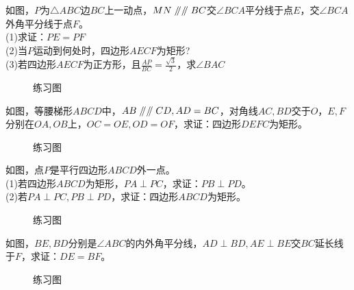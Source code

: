 \begin{problem}
如图，$P$为$\triangle ABC$边$BC$上一动点，$MN\mathrel{/\mkern-5mu/}\mathrel{/\mkern-5mu/} BC$交$\angle BCA$平分线于点$E$，交$\angle BCA$外角平分线于点$F$。\\
(1)求证：$PE=PF$ \\
(2)当$P$运动到何处时，四边形$AECF$为矩形? \\
(3)若四边形$AECF$为正方形，且$\frac{AP}{BC}=\frac{\sqrt{3}}{2}$，求$\angle BAC$ \\
\end{problem}
\begin{figure}[H]
    \centering
    \resizebox{4cm}{!}{}
    \caption{练习图}
\end{figure}
\begin{problem}
如图，等腰梯形$ABCD$中，$AB\mathrel{/\mkern-5mu/} \mathrel{/\mkern-5mu/} CD,AD=BC$，对角线$AC,BD$交于$O$，$E,F$分别在$OA,OB$上，$OC=OE,OD=OF$，求证：四边形$DEFC$为矩形。
\end{problem}
\begin{figure}[H]
    \centering
    \resizebox{4cm}{!}{}
    \caption{练习图}
\end{figure}
\begin{problem}
如图，点$P$是平行四边形$ABCD$外一点。\\
(1)若四边形$ABCD$为矩形，$PA\perp PC$，求证：$PB\perp PD$。 \\
(2)若$PA \perp PC,PB \perp PD$，求证：四边形$ABCD$为矩形。 \\
\end{problem}
\begin{figure}[H]
    \centering
    \resizebox{4cm}{!}{}
    \caption{练习图}
\end{figure}
\begin{problem}
如图，$BE,BD$分别是$\angle ABC$的内外角平分线，$AD\perp BD,AE\perp BE$交$BC$延长线于$F$，求证：$DE=BF$。 \\
\end{problem}
\begin{figure}[H]
    \centering
    \resizebox{4cm}{!}{}
    \caption{练习图}
\end{figure}
\clearpage
